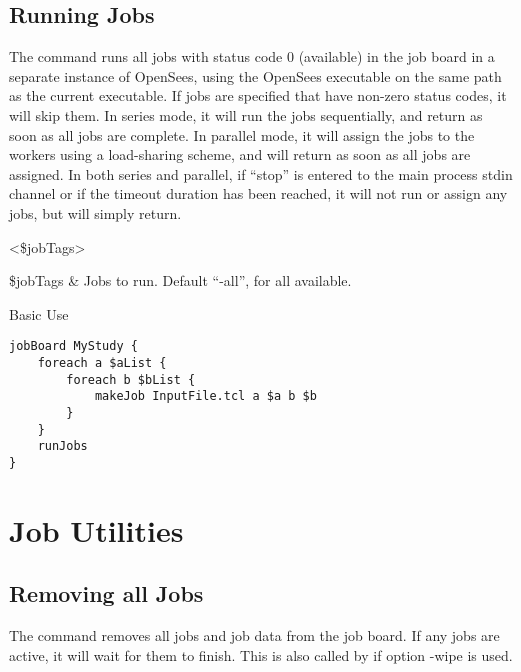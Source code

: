 \documentclass{article}
\renewcommand{\^}[1]{\textsuperscript{#1}}
\renewcommand{\_}[1]{\textsubscript{#1}}
\begin{document}
\subsection{Running Jobs}
The command  runs all jobs with status code 0 (available) in the job board in a separate instance of OpenSees, using the OpenSees executable on the same path as the current executable.
If jobs are specified that have non-zero status codes, it will skip them.
In series mode, it will run the jobs sequentially, and return as soon as all jobs are complete. 
In parallel mode, it will assign the jobs to the workers using a load-sharing scheme, and will return as soon as all jobs are assigned. 
In both series and parallel, if ``stop'' is entered to the main process stdin channel or if the timeout duration has been reached, it will not run or assign any jobs, but will simply return.
\begin{syntax}
 <\$jobTags>
\end{syntax}
\begin{args}
\$jobTags & Jobs to run. Default ``-all'', for all available.
\end{args}
\begin{example}{Basic Use}
\begin{lstlisting}
jobBoard MyStudy {
    foreach a $aList {
        foreach b $bList {
            makeJob InputFile.tcl a $a b $b
        }
    }
    runJobs
}
\end{lstlisting}
\end{example}

\clearpage
\section{Job Utilities}

\subsection{Removing all Jobs}
The command  removes all jobs and job data from the job board.
If any jobs are active, it will wait for them to finish.
This is also called by  if option -wipe is used.
\begin{syntax}
\end{syntax}
\end{document}

